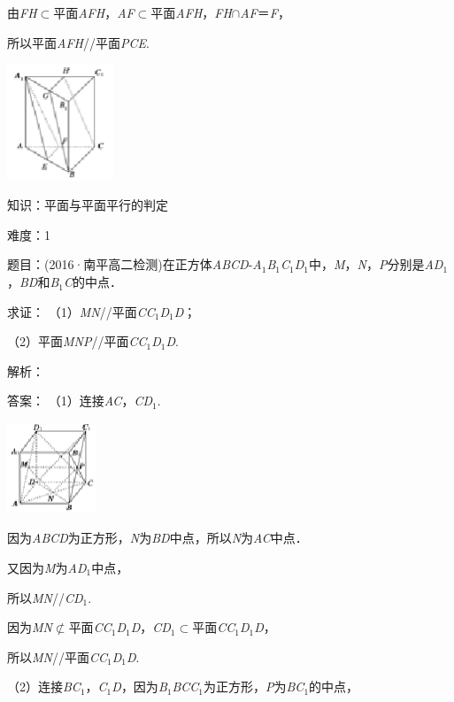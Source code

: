 \documentclass{article} %
\begin{document}
由\textit{FH}$\mathrm{\subset }$平面\textit{AFH}，\textit{AF}$\mathrm{\subset }$平面\textit{AFH}，\textit{FH}$\mathrm{\cap}$\textit{AF}＝\textit{F}，

所以平面\textit{AFH}//平面\textit{PCE}.

\includegraphics*[width=1.25in, height=1.37in, keepaspectratio=false]{image150}

知识：平面与平面平行的判定

难度：1

题目：(2016·南平高二检测)在正方体\textit{ABCD}-\textit{A}${}_{1}$\textit{B}${}_{1}$\textit{C}${}_{1}$\textit{D}${}_{1}$中，\textit{M}，\textit{N}，\textit{P}分别是\textit{AD}${}_{1}$，\textit{BD}和\textit{B}${}_{1}$\textit{C}的中点．

求证：
（1）\textit{MN}//平面\textit{CC}${}_{1}$\textit{D}${}_{1}$\textit{D}；

（2）平面\textit{MNP}//平面\textit{CC}${}_{1}$\textit{D}${}_{1}$\textit{D}.

解析：

答案：
（1）连接\textit{AC}，\textit{CD}${}_{1}$.

\includegraphics*[width=1.05in, height=1.07in, keepaspectratio=false]{image151}

因为\textit{ABCD}为正方形，\textit{N}为\textit{BD}中点，所以\textit{N}为\textit{AC}中点．

又因为\textit{M}为\textit{AD}${}_{1}$中点，

所以\textit{MN}//\textit{CD}${}_{1}$.

因为\textit{MN}$\mathrm{\nsubset}$平面\textit{CC}${}_{1}$\textit{D}${}_{1}$\textit{D}，\textit{CD}${}_{1}$$\mathrm{\subset }$平面\textit{CC}${}_{1}$\textit{D}${}_{1}$\textit{D}，

所以\textit{MN}//平面\textit{CC}${}_{1}$\textit{D}${}_{1}$\textit{D}.

（2）连接\textit{BC}${}_{1}$，\textit{C}${}_{1}$\textit{D}，因为\textit{B}${}_{1}$\textit{BCC}${}_{1}$为正方形，\textit{P}为\textit{BC}${}_{1}$的中点，
\end{document}
